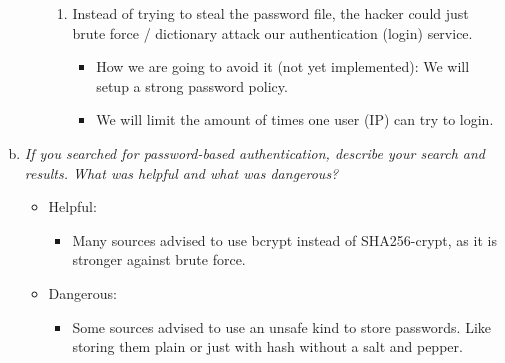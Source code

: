 \begin{enumerate}[(a)]
\begin{itemize}
\begin{enumerate}[1.]
            \item Instead of trying to steal the password file, the hacker could just brute force / dictionary attack our authentication (login) service.
            \begin{itemize}
                \item How we are going to avoid it (not yet implemented): We will setup a strong password policy.
                \item We will limit the amount of times one user (IP) can try to login.
            \end{itemize}
            
        \end{enumerate}
    \end{itemize}

    \item {\itshape If you searched for password-based authentication, describe your search and results. What was helpful and what was dangerous?}
    \begin{itemize}
        \item Helpful:
        \begin{itemize}
            \item Many sources advised to use bcrypt instead of SHA256-crypt, as it is stronger against brute force.
        \end{itemize}
        \item Dangerous:
        \begin{itemize}
            \item Some sources advised to use an unsafe kind to store passwords. Like storing them plain or just with hash without a salt and pepper.
        \end{itemize}
    \end{itemize}

\end{enumerate}




